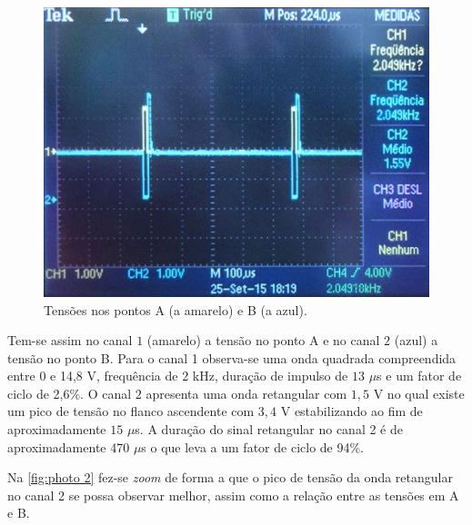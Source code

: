 \documentclass[a4paper,11pt]{article}
\numberwithin{equation}{section}
\begin{document}
\begin{figure}[h]
	\centering
	\includegraphics[keepaspectratio=true, scale=0.55]{img/fig4}
	\caption{Tensões nos pontos A (a amarelo) e B (a azul).}
	\label{fig:photo 1}
	\vspace{-0.8em}
\end{figure}

Tem-se assim no canal $1$ (amarelo) a tensão no ponto A e no canal $2$ (azul) a tensão no ponto B. Para o canal 1 observa-se uma onda quadrada compreendida entre 0 e 14,8 V, frequência de $2$ kHz, duração de impulso de $13$ $\mu$s e um fator de ciclo de 2,6\%. O canal $2$ apresenta uma onda retangular com $1,5$ V no qual existe um pico de tensão no flanco ascendente com $3,4$ V estabilizando ao fim de aproximadamente $15$ $\mu$s. A duração do sinal retangular no canal 2 é de aproximadamente 470 $\mu$s o que leva a um fator de ciclo de 94\%.

Na \autoref{fig:photo 2} fez-se \textit{zoom} de forma a que o pico de tensão da onda retangular no canal 2 se possa observar melhor, assim como a relação entre as tensões em A e B.

\pagebreak
\end{document}
